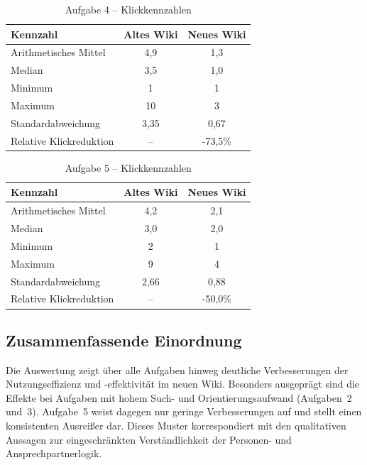 \begin{table}[H]
\centering
\caption{Aufgabe 4 -- Klickkennzahlen}
\label{tab:BB-task4-clicks}
\begin{tabular}{l c c}
\toprule
Kennzahl & Altes Wiki & Neues Wiki \\
\midrule
Arithmetisches Mittel & 4,9 & 1,3 \\
Median & 3,5 & 1,0 \\
Minimum & 1 & 1 \\
Maximum & 10 & 3 \\
Standardabweichung & 3,35 & 0,67 \\
Relative Klickreduktion & -- & -73,5\% \\
\bottomrule
\end{tabular}
\end{table}

\begin{table}[H]
\centering
\caption{Aufgabe 5 -- Klickkennzahlen}
\label{tab:BB-task5-clicks}
\begin{tabular}{l c c}
\toprule
Kennzahl & Altes Wiki & Neues Wiki \\
\midrule
Arithmetisches Mittel & 4,2 & 2,1 \\
Median & 3,0 & 2,0 \\
Minimum & 2 & 1 \\
Maximum & 9 & 4 \\
Standardabweichung & 2,66 & 0,88 \\
Relative Klickreduktion & -- & -50,0\% \\
\bottomrule
\end{tabular}
\end{table}

\subsection{Zusammenfassende Einordnung}

Die Auswertung zeigt über alle Aufgaben hinweg deutliche Verbesserungen der Nutzungseffizienz und -effektivität im neuen Wiki. Besonders ausgeprägt sind die Effekte bei Aufgaben mit hohem Such- und Orientierungsaufwand (Aufgaben~2 und~3). Aufgabe~5 weist dagegen nur geringe Verbesserungen auf und stellt einen konsistenten Ausreißer dar. Dieses Muster korrespondiert mit den qualitativen Aussagen zur eingeschränkten Verständlichkeit der Personen- und Ansprechpartnerlogik.

\newpage
